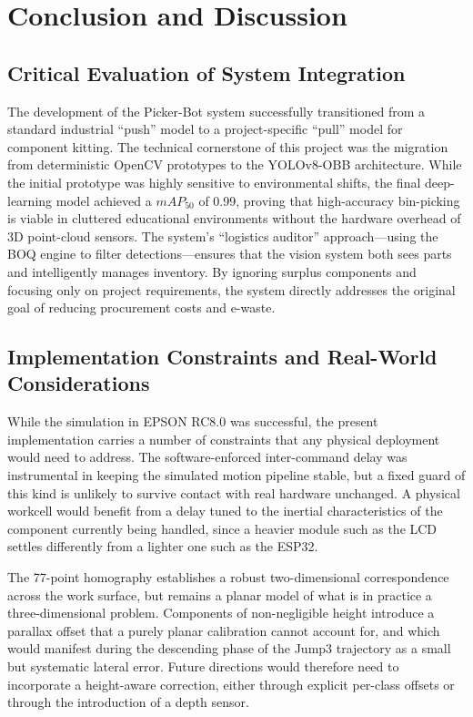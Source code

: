 \documentclass{MIPRO}
\begin{document}
\section{Conclusion and Discussion}

\subsection{Critical Evaluation of System Integration}

The development of the Picker-Bot system successfully transitioned from a standard industrial ``push'' model to a project-specific ``pull'' model for component kitting. The technical cornerstone of this project was the migration from deterministic OpenCV prototypes to the YOLOv8-OBB architecture. While the initial prototype was highly sensitive to environmental shifts, the final deep-learning model achieved a $mAP_{50}$ of 0.99, proving that high-accuracy bin-picking is viable in cluttered educational environments without the hardware overhead of 3D point-cloud sensors. The system's ``logistics auditor'' approach---using the BOQ engine to filter detections---ensures that the vision system both sees parts and intelligently manages inventory. By ignoring surplus components and focusing only on project requirements, the system directly addresses the original goal of reducing procurement costs and e-waste.

\subsection{Implementation Constraints and Real-World Considerations}

While the simulation in EPSON RC8.0 was successful, the present implementation carries a number of constraints that any physical deployment would need to address. The software-enforced inter-command delay was instrumental in keeping the simulated motion pipeline stable, but a fixed guard of this kind is unlikely to survive contact with real hardware unchanged. A physical workcell would benefit from a delay tuned to the inertial characteristics of the component currently being handled, since a heavier module such as the LCD settles differently from a lighter one such as the ESP32.

The 77-point homography establishes a robust two-dimensional correspondence across the work surface, but remains a planar model of what is in practice a three-dimensional problem. Components of non-negligible height introduce a parallax offset that a purely planar calibration cannot account for, and which would manifest during the descending phase of the Jump3 trajectory as a small but systematic lateral error. Future directions would therefore need to incorporate a height-aware correction, either through explicit per-class offsets or through the introduction of a depth sensor.
\end{document}
